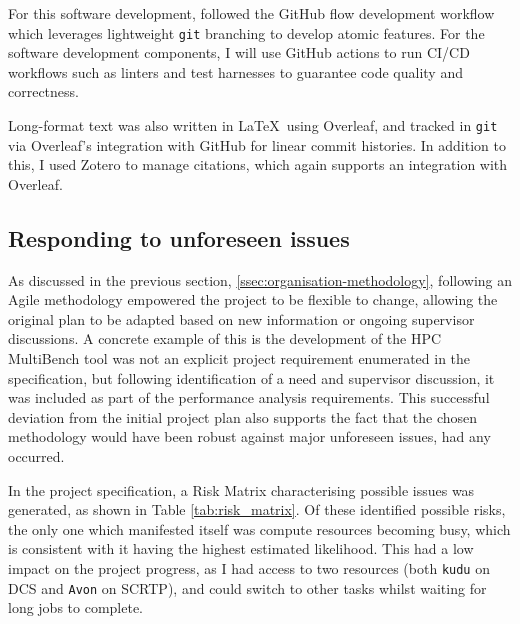 For this software development, followed the GitHub flow development workflow \cite{GitHubFlow} which leverages lightweight \texttt{git} branching to develop atomic features. For the software development components, I will use GitHub actions to run CI/CD workflows \cite{WhatCICD} such as linters and test harnesses to guarantee code quality and correctness.


Long-format text was also written in \LaTeX\ using Overleaf\cite{OverleafOnlineLaTeX}, and tracked in \texttt{git} via Overleaf's integration with GitHub for linear commit histories. In addition to this, I used Zotero \cite{ZoteroYourPersonal} to manage citations, which again supports an integration with Overleaf.


\subsection{Responding to unforeseen issues}
\label{ssec:organisation-unforeseen-issues}

As discussed in the previous section, \ref{ssec:organisation-methodology}, following an Agile methodology empowered the project to be flexible to change, allowing the original plan to be adapted based on new information or ongoing supervisor discussions. A concrete example of this is the development of the HPC MultiBench tool was not an explicit project requirement enumerated in the specification, but following identification of a need and supervisor discussion, it was included as part of the performance analysis requirements. This successful deviation from the initial project plan also supports the fact that the chosen methodology would have been robust against major unforeseen issues, had any occurred.

In the project specification, a Risk Matrix characterising possible issues was generated, as shown in Table \ref{tab:risk_matrix}.
Of these identified possible risks, the only one which manifested itself was compute resources becoming busy, which is consistent with it having the highest estimated likelihood. This had a low impact on the project progress, as I had access to two resources (both \texttt{kudu} on DCS and \texttt{Avon} on SCRTP), and could switch to other tasks whilst waiting for long jobs to complete.


